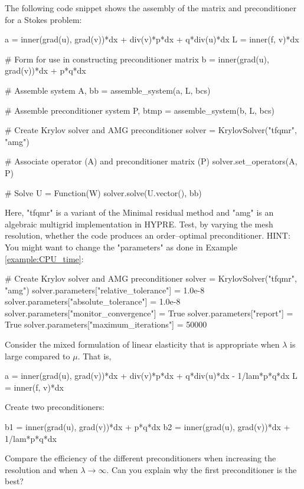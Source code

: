 \begin{exercise}
\label{ex:stokes}
The following code snippet shows the assembly of the matrix and preconditioner
for a Stokes problem: 
\begin{python} 
a = inner(grad(u), grad(v))*dx + div(v)*p*dx + q*div(u)*dx
L = inner(f, v)*dx

# Form for use in constructing preconditioner matrix
b = inner(grad(u), grad(v))*dx + p*q*dx

# Assemble system
A, bb = assemble_system(a, L, bcs)

# Assemble preconditioner system
P, btmp = assemble_system(b, L, bcs)

# Create Krylov solver and AMG preconditioner
solver = KrylovSolver("tfqmr", "amg")

# Associate operator (A) and preconditioner matrix (P)
solver.set_operators(A, P)

# Solve
U = Function(W)
solver.solve(U.vector(), bb)
\end{python} 
Here, "tfqmr" is a variant of the Minimal residual method and "amg" is an algebraic 
multigrid implementation in HYPRE. Test, by varying the mesh resolution, whether
the code produces an order--optimal preconditioner.  
HINT: You might want to change the "parameters" as done
in Example \ref{example:CPU_time}: 
\begin{python}
# Create Krylov solver and AMG preconditioner
solver = KrylovSolver("tfqmr", "amg")
solver.parameters["relative_tolerance"] = 1.0e-8
solver.parameters["absolute_tolerance"] = 1.0e-8
solver.parameters["monitor_convergence"] = True
solver.parameters["report"] = True
solver.parameters["maximum_iterations"] = 50000
\end{python}
\end{exercise}

\begin{exercise}
\label{ex:stokes}
Consider the mixed formulation of linear elasticity that
is appropriate when $\lambda$ is large compared to $\mu$. That is, 
\begin{python} 
a = inner(grad(u), grad(v))*dx + div(v)*p*dx + q*div(u)*dx - 1/lam*p*q*dx 
L = inner(f, v)*dx
\end{python}
Create two preconditioners: 
\begin{python} 
b1 = inner(grad(u), grad(v))*dx + p*q*dx
b2 = inner(grad(u), grad(v))*dx + 1/lam*p*q*dx
\end{python} 
Compare the efficiency of the different preconditioners when increasing
the resolution and when $\lambda\rightarrow\infty$. 
Can you explain why the first preconditioner is the best?
\end{exercise}



